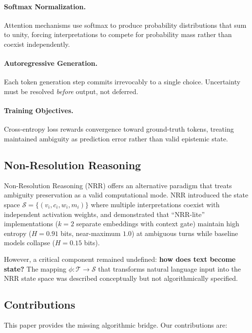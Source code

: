 \documentclass[11pt,a4paper]{article}
\begin{document}
\paragraph{Softmax Normalization.}
Attention mechanisms use softmax to produce probability distributions that sum to unity, 
forcing interpretations to compete for probability mass rather than coexist independently.

\paragraph{Autoregressive Generation.}
Each token generation step commits irrevocably to a single choice. Uncertainty must be 
resolved \textit{before} output, not deferred.

\paragraph{Training Objectives.}
Cross-entropy loss rewards convergence toward ground-truth tokens, treating maintained 
ambiguity as prediction error rather than valid epistemic state.

\subsection{Non-Resolution Reasoning}

Non-Resolution Reasoning (NRR) \cite{saito2025nrr} offers an alternative paradigm that 
treats ambiguity preservation as a valid computational mode. NRR introduced the state 
space $\mathcal{S} = \{(v_i, c_i, w_i, m_i)\}$ where multiple interpretations coexist with 
independent activation weights, and demonstrated that ``NRR-lite'' 
implementations ($k{=}2$ separate embeddings with context gate) maintain high entropy 
($H = 0.91$ bits, near-maximum $1.0$) at ambiguous turns while baseline 
models collapse ($H = 0.15$ bits).

However, a critical component remained undefined: \textbf{how does text become state?} 
The mapping $\phi: \mathcal{T} \to \mathcal{S}$ that transforms natural language input 
into the NRR state space was described conceptually but not algorithmically specified.

\subsection{Contributions}

This paper provides the missing algorithmic bridge. Our contributions are:
\end{document}
